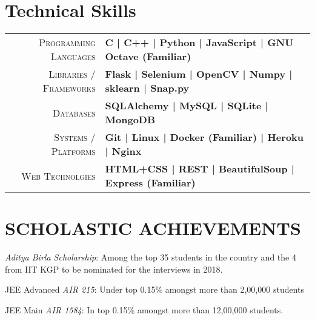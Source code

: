 \documentclass[]{deedy-resume-openfont}
\begin{document}
\begin{minipage}[t]{0.66\textwidth}
\begin{tightemize}
\end{tightemize}
\sectionsep


\section{Technical Skills}
\begin{tabular}{r|p{15cm}}
\textsc{Programming Languages} & \textbf{ C | C++ | Python | JavaScript | GNU Octave (Familiar)} \\
\textsc{Libraries / Frameworks} & \textbf{Flask | Selenium | OpenCV | Numpy | sklearn | Snap.py }\\
\textsc{Databases} & \textbf{SQLAlchemy | MySQL | SQLite | MongoDB }\\
\textsc{Systems / Platforms} & \textbf{Git | Linux | Docker (Familiar) | Heroku | Nginx}\\ 
\textsc{Web Technolgies} & \textbf{HTML+CSS | REST | BeautifulSoup | Express (Familiar)
} \\
\end{tabular}

\section{SCHOLASTIC ACHIEVEMENTS}

\vspace{\topsep} %
\begin{tightemize}

\item {\emph{Aditya Birla Scholarship}:} Among the top 35 students in the country and the 4 from IIT KGP to be nominated for the interviews in 2018.\\
\item{JEE Advanced \emph{AIR 215}:} Under top 0.15\% amongst more than 2,00,000 students \\
\item {JEE Main \emph{AIR 1584}:} In top 0.15\% amongst more than 12,00,000 students. \\
\end{tightemize}
\sectionsep



\end{minipage}
\end{document}
